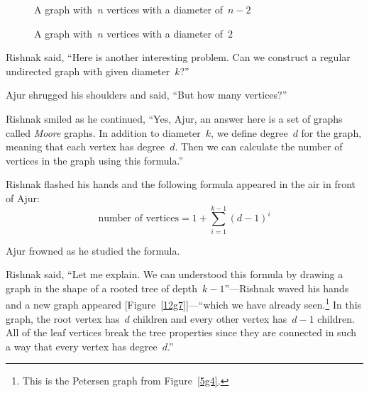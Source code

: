 \begin{figure}
\begin{center}
\caption{A graph with~$n$ vertices with a diameter of~$n-2$}\label{12g5}
\end{center}
\end{figure}
\begin{figure}
 \begin{center}
\caption{A graph with~$n$ vertices with a diameter of~$2$}\label{12g6}
\end{center}
\end{figure}

Rishnak said, ``Here is another interesting problem. Can we construct a regular undirected graph with given diameter~$k$?''

Ajur shrugged his shoulders and said, ``But how many vertices?''

Rishnak smiled as he continued, ``Yes, Ajur, an answer here is a set of graphs called \textit{Moore} graphs. In addition to diameter~$k$, we define degree~$d$ for the graph, meaning that each vertex has degree~$d$. Then we can calculate the number of vertices in the graph using this formula.'' 

Rishnak flashed his hands and the following formula appeared in the air in front of Ajur:
$$\text{number of vertices} = 1+\sum_{i=1}^{k-1} (d-1)^i$$

Ajur frowned as he studied the formula.

Rishnak said, ``Let me explain. We can understood this formula by drawing a graph in the shape of a rooted tree of depth~$k-1$''---Rishnak waved his hands and a new graph appeared [Figure~\ref{12g7}]---``which we have already seen.\footnote{This is the Petersen graph from Figure~\ref{5g4}.} In this graph, the root vertex has~$d$ children and every other vertex has~$d-1$ children. All of the leaf vertices break the tree properties since they are connected in such a way that every vertex has degree~$d$.''

